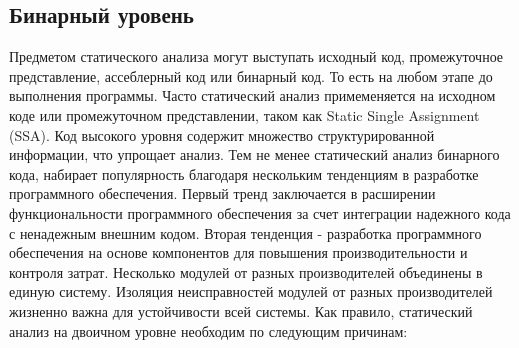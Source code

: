 \subsection{Бинарный уровень}
Предметом статического анализа могут выступать исходный код, промежуточное представление, ассеблерный код или
бинарный код. То есть на любом этапе до выполнения программы. Часто статический анализ примеменяется на исходном коде
или промежуточном представлении, таком как  Static Single Assignment (SSA). Код высокого уровня содержит множество 
структурированной информации, что упрощает анализ. Тем не менее статический анализ бинарного кода, набирает популярность 
благодаря нескольким тенденциям в разработке программного обеспечения. Первый тренд заключается в расширении 
функциональности программного обеспечения за счет интеграции надежного кода с ненадежным внешним кодом. Вторая тенденция - 
разработка программного обеспечения на основе компонентов для повышения производительности и контроля затрат.
Несколько модулей от разных производителей объединены в единую систему. Изоляция неисправностей модулей от разных производителей жизненно важна для устойчивости всей системы.
Как правило, статический анализ на двоичном уровне необходим по следующим причинам\cite{Zeng2012StaticAO}:
